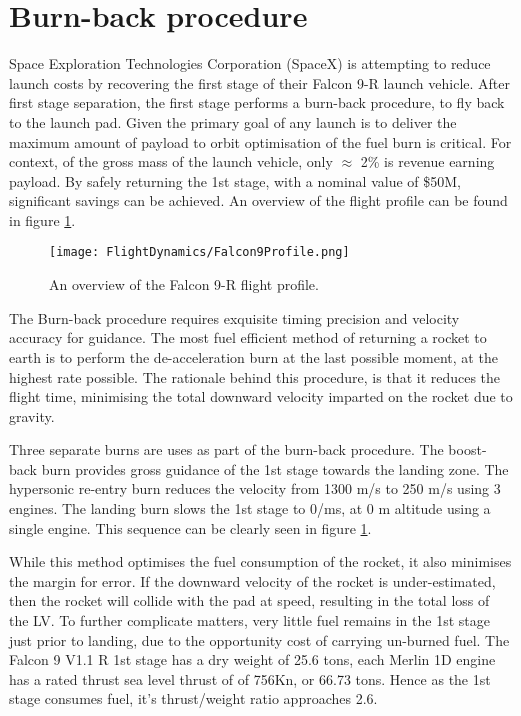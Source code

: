 \clearpage
\section{Burn-back procedure}

Space Exploration Technologies Corporation (SpaceX) is attempting to reduce launch costs by recovering the first stage of their Falcon 9-R launch vehicle. After first stage separation, the first stage performs a burn-back procedure, to fly back to the launch pad\cite{SpaceXFalcon9}. Given the primary goal of any launch is to deliver the maximum amount of payload to orbit optimisation of the fuel burn is critical. For context, of the gross mass of the launch vehicle, only $\approx$ 2\%  is revenue earning payload. By safely returning the 1st stage, with a nominal value of \$50M, significant savings can be achieved. An overview of the flight profile can be found in figure \ref{fig:Falcon9Profile}.


\begin{figure}[!htb] 
    \centering
    \texttt{[image: FlightDynamics/Falcon9Profile.png]} 
    \caption{An overview of the Falcon 9-R flight profile.}
    \label{fig:Falcon9Profile}
\end{figure}


The Burn-back procedure requires exquisite timing precision and velocity accuracy for guidance. The most fuel efficient method of returning a rocket to earth is to perform the de-acceleration burn at the last possible moment, at the highest rate possible. The rationale behind this procedure, is that it reduces the flight time, minimising the total downward velocity imparted on the rocket due to gravity. 

Three separate burns are uses as part of the burn-back procedure. The boost-back burn provides gross guidance of the 1st stage towards the landing zone. The hypersonic re-entry burn reduces the velocity from 1300 m/s to  250 m/s using 3 engines. The landing burn slows the 1st stage to 0/ms, at 0 m altitude using a single engine. This sequence can be clearly seen in figure \ref{fig:Falcon9Profile}.

While this method optimises the fuel consumption of the rocket, it also minimises the margin for error. If the downward velocity of the rocket is under-estimated, then the rocket will collide with the pad at speed, resulting in the total loss of the \ac{LV}.  To further complicate matters, very little fuel remains in the 1st stage just prior to landing, due to the opportunity cost of carrying un-burned fuel. The Falcon 9 V1.1 R 1st stage has a dry weight of 25.6 tons, each Merlin 1D engine has a rated thrust sea level thrust of of 756Kn, or 66.73 tons. Hence as the 1st stage consumes fuel, it's thrust/weight ratio approaches 2.6. 

